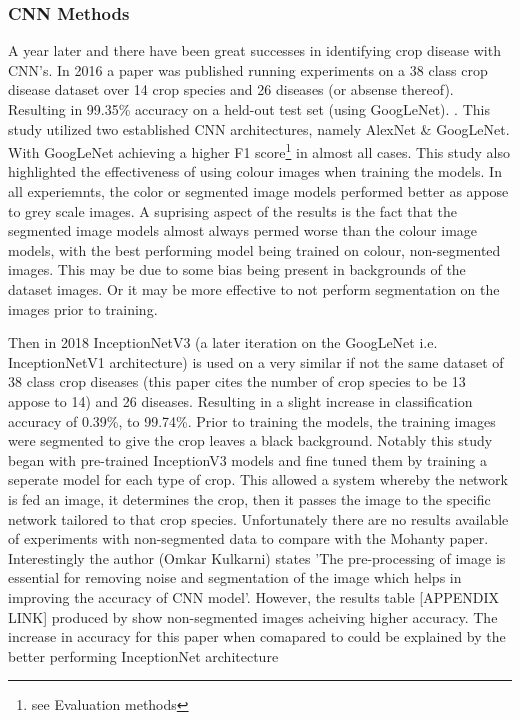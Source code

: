   \subsubsection{CNN Methods}
    A year later and there have been great successes in identifying crop disease with CNN's. In 2016 a paper was published running experiments on a 38 class crop disease dataset over 14 crop species and 26 diseases (or absense thereof). Resulting in 99.35\% accuracy on a held-out test set (using GoogLeNet). \cite{Mohanty2016}. This study utilized two established CNN architectures, namely AlexNet \cite{Krizhevsky} \& GoogLeNet. \cite{Szegedy_2015_CVPR} With GoogLeNet achieving a higher F1 score\footnote{see Evaluation methods} in almost all cases.
    This study also highlighted the effectiveness of using colour images when training the models. In all experiemnts, the color or segmented image models performed better as appose to grey scale images. A suprising aspect of the results is the fact that the segmented image models almost always permed worse than the colour image models, with the best performing model being trained on colour, non-segmented images. This may be due to some bias being present in backgrounds of the dataset images. Or it may be more effective to not perform segmentation on the images prior to training.
    \par
    Then in 2018 InceptionNetV3 (a later iteration on the GoogLeNet i.e. InceptionNetV1 architecture) is used on a very similar if not the same dataset of 38 class crop diseases (this paper cites the number of crop species to be 13 appose to 14) and 26 diseases. Resulting in a slight increase in classification accuracy of 0.39\%, to 99.74\%. \cite{Kulkarni2018}
    Prior to training the models, the training images were segmented to give the crop leaves a black background.
    Notably this study began with pre-trained InceptionV3 models and fine tuned them by training a seperate model for each type of crop. This allowed a system whereby the network is fed an image, it determines the crop, then it passes the image to the specific network tailored to that crop species.
    Unfortunately there are no results available of experiments with non-segmented data to compare with the Mohanty paper. Interestingly the author (Omkar Kulkarni) states 'The pre-processing of image is essential for removing noise and segmentation of the image which helps in improving the accuracy of CNN model'. However, the results table [APPENDIX LINK] produced by \cite{Mohanty2016} show non-segmented images acheiving higher accuracy. The increase in accuracy for this paper when comapared to \cite{Mohanty2016} could be explained by the better performing InceptionNet architecture %
